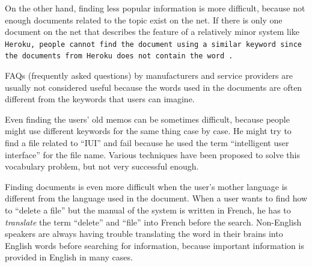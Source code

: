 \documentclass[manuscript,anonymous,review]{acmart}
\begin{document}


On the other hand,
finding less popular information is more difficult,
because not enough documents related to the topic exist on the net.
%
If there is only one document on the net
that describes the  feature of a relatively minor system like \tt{Heroku},
people cannot find the document using a similar keyword 
since the documents from \tt{Heroku} does not contain the word .



FAQs (frequently asked questions) by manufacturers and service providers are
usually not considered useful
because the words used in the documents are
often different from the keywords that users can imagine.


Even finding the users' old memos can be sometimes difficult,
because people might use different keywords for the same thing case by case.
He might try to find a file related to ``IUI'' and fail because he used
the term ``intelligent user interface'' for the file name.
%
Various techniques have been proposed to solve this vocabulary problem\cite{Furnas:1987:VPH:32206.32212},
but not very successful enough.


Finding documents is even more difficult when
the user's mother language is different from the language used in the document.
When a user wants to find how to ``delete a file'' but the
manual of the system is written in French,
he has to \textit{translate} the term ``delete'' and ``file'' into French
before the search.
Non-English speakers are always having trouble
translating the word in their brains into English words
before searching for information, because important information is
provided in English in many cases.
\end{document}
